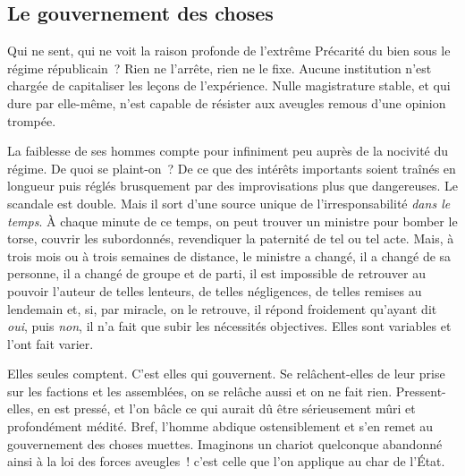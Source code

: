 \documentclass[french,twoside]{book} %
\newcommand{\astermono}{\medskip\centerline{\color{rubric}\large\selectfont{\syms ✻}}\medskip\par}%
\begin{document}
\astermono

\subsection[Le gouvernement des choses]{Le gouvernement des choses}
\noindent Qui ne sent, qui ne voit la raison profonde de l’extrême Précarité du bien sous le régime républicain ? Rien ne l’arrête, rien ne le fixe. Aucune institution n’est chargée de capitaliser les leçons de l’expérience. Nulle magistrature stable, et qui dure par elle-même, n’est capable de résister aux aveugles remous d’une opinion trompée.\par
La faiblesse de ses hommes compte pour infiniment peu auprès de la nocivité du régime. De quoi se plaint-on ? De ce que des intérêts importants soient traînés en longueur puis réglés brusquement par des improvisations plus que dangereuses. Le scandale est double. Mais il sort d’une source unique de l’irresponsabilité \emph{dans le temps}. À chaque minute de ce temps, on peut trouver un ministre pour bomber le torse, couvrir les subordonnés, revendiquer la paternité de tel ou tel acte. Mais, à trois mois ou à trois semaines de distance, le ministre a changé, il a changé de sa personne, il a changé de groupe et de parti, il est impossible de retrouver au pouvoir l’auteur de telles lenteurs, de telles négligences, de telles remises au lendemain et, si, par miracle, on le retrouve, il répond froidement qu’ayant dit \emph{oui}, puis \emph{non}, il n’a fait que subir les nécessités objectives. Elles sont variables et l’ont fait varier.\par
Elles seules comptent. C’est elles qui gouvernent. Se relâchent-elles de leur prise sur les factions et les assemblées, on se relâche aussi et on ne fait rien. Pressent-elles, en est pressé, et l’on bâcle ce qui aurait dû être sérieusement mûri et profondément médité. Bref, l’homme abdique ostensiblement et s’en remet au gouvernement des choses muettes. Imaginons un chariot quelconque abandonné ainsi à la loi des forces aveugles ! c’est celle que l’on applique au char de l’État.\par

\astermono
\end{document}
